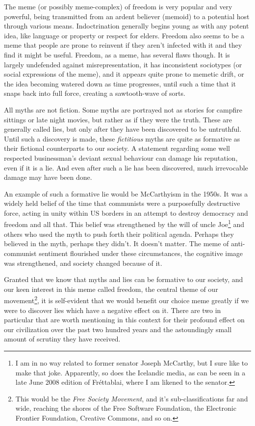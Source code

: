 The meme (or possibly meme-complex) of freedom is very popular and very
powerful, being transmitted from an ardent believer (memoid) to a potential 
host through various means. Indoctrination generally begins young as with any
potent idea, like language or property or respect for elders. Freedom also 
seems to be a meme that people are prone to reinvent if they aren't infected
with it and they f\hbox{}ind it might be useful. Freedom, as a meme, has 
several f\hbox{}laws though. It is largely undefended against 
misrepresentation, it has inconsistent sociotypes (or social expressions of the
meme), and it appears quite prone to memetic drift, or the idea becoming 
watered down as time progresses, until such a time that it snaps back into full
force, creating a sawtooth-wave of sorts.

All myths are not f\hbox{}iction. Some myths are portrayed not as stories for
campf\hbox{}ire sittings or late night movies, but rather as if they were the
truth. These are generally called lies, but only after they have been 
discovered to be untruthful. Until such a discovery is made, these
\textit{f\hbox{}ictitious} myths are quite as formative as their
f\hbox{}ictional counterparts to our society. A statement regarding some well
respected businessman's deviant sexual behaviour can damage his reputation, 
even if it is a lie. And even after such a lie has been discovered, much
irrevocable damage may have been done.

An example of such a formative lie would be McCarthyism in the 1950s. It was a
widely held belief of the time that communists were a purposefully destructive
force, acting in unity within US borders in an attempt to destroy democracy and
freedom and all that. This belief was strengthened by the will of uncle
Joe\footnote{I am in no way related to former senator Joseph McCarthy, but I
sure like to make that joke. Apparently, so does the Icelandic media, as can be
seen in a late June 2008 edition of Fréttabla{\dh}i{\dh}, where I am likened to the
senator.} and others who used the myth to push forth their political agenda.
Perhaps they believed in the myth, perhaps they didn't. It doesn't matter. The
meme of anti-communist sentiment f\hbox{}lourished under these circumstances,
the cognitive image was strengthened, and society changed because of it.

Granted that we know that myths and lies can be formative to our society, and
our keen interest in this meme called freedom, the central theme of our
movement\footnote{This would be the \textit{Free Society Movement}, and it's
sub-classif\hbox{}ications far and wide, reaching the shores of the Free
Software Foundation, the Electronic Frontier Foundation, Creative Commons, and
so on.}, it is self-evident that we would benef\hbox{}it our choice meme 
greatly if we were to discover lies which have a negative ef\hbox{}fect on it.
There are two in particular that are worth mentioning in this context for their
profound ef\hbox{}fect on our civilization over the past two hundred years and
the astoundingly small amount of scrutiny they have received. 



